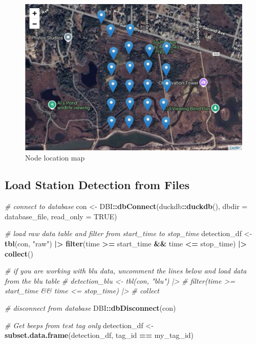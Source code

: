 \documentclass[
]{book}
\newenvironment{Shaded}{\begin{snugshade}}{\end{snugshade}}
\newcommand{\AttributeTok}[1]{\textcolor[rgb]{0.13,0.29,0.53}{#1}}
\newcommand{\CommentTok}[1]{\textcolor[rgb]{0.56,0.35,0.01}{\textit{#1}}}
\newcommand{\ConstantTok}[1]{\textcolor[rgb]{0.56,0.35,0.01}{#1}}
\newcommand{\FunctionTok}[1]{\textcolor[rgb]{0.13,0.29,0.53}{\textbf{#1}}}
\newcommand{\NormalTok}[1]{#1}
\newcommand{\OtherTok}[1]{\textcolor[rgb]{0.56,0.35,0.01}{#1}}
\newcommand{\SpecialCharTok}[1]{\textcolor[rgb]{0.81,0.36,0.00}{\textbf{#1}}}
\newcommand{\StringTok}[1]{\textcolor[rgb]{0.31,0.60,0.02}{#1}}
\begin{document}
\begin{figure}
\centering
\includegraphics{images/node_calibration_2.4_node_map.png}
\caption{Node location map}
\end{figure}

\subsection{Load Station Detection from Files}\label{load-station-detection-from-files}

\begin{Shaded}
\begin{Highlighting}[]
\CommentTok{\# connect to database}
\NormalTok{con }\OtherTok{\textless{}{-}}\NormalTok{ DBI}\SpecialCharTok{::}\FunctionTok{dbConnect}\NormalTok{(duckdb}\SpecialCharTok{::}\FunctionTok{duckdb}\NormalTok{(), }
                      \AttributeTok{dbdir =}\NormalTok{ database\_file, }
                      \AttributeTok{read\_only =} \ConstantTok{TRUE}\NormalTok{)}

\CommentTok{\# load raw data table and filter from start\_time to stop\_time}
\NormalTok{detection\_df }\OtherTok{\textless{}{-}} \FunctionTok{tbl}\NormalTok{(con, }\StringTok{"raw"}\NormalTok{) }\SpecialCharTok{|\textgreater{}} 
  \FunctionTok{filter}\NormalTok{(time }\SpecialCharTok{\textgreater{}=}\NormalTok{ start\_time }\SpecialCharTok{\&\&}\NormalTok{ time }\SpecialCharTok{\textless{}=}\NormalTok{ stop\_time) }\SpecialCharTok{|\textgreater{}}
  \FunctionTok{collect}\NormalTok{()}

\CommentTok{\# if you are working with blu data, uncomment the lines below and load data from the blu table}
\CommentTok{\# detection\_blu \textless{}{-} tbl(con, "blu") |\textgreater{}}
\CommentTok{\#   filter(time \textgreater{}= start\_time \&\& time \textless{}= stop\_time) |\textgreater{}}
\CommentTok{\#   collect}

\CommentTok{\# disconnect from database}
\NormalTok{DBI}\SpecialCharTok{::}\FunctionTok{dbDisconnect}\NormalTok{(con)}

\CommentTok{\# Get beeps from test tag only}
\NormalTok{detection\_df }\OtherTok{\textless{}{-}} \FunctionTok{subset.data.frame}\NormalTok{(detection\_df, }
\NormalTok{                                  tag\_id }\SpecialCharTok{==}\NormalTok{ my\_tag\_id)}
\end{Highlighting}
\end{Shaded}
\end{document}
